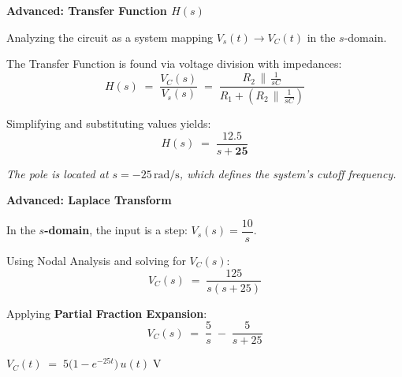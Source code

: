 \documentclass[12pt]{beamer}
\begin{document}
\begin{frame}{\textbf{Advanced: Transfer Function $H(s)$}}
  \begin{center}
    \vfill
    Analyzing the circuit as a system mapping $V_s(t) \to V_C(t)$ in the $s$-domain.

    \vspace{1.5em}
    The Transfer Function is found via voltage division with impedances:
    \[
      H(s) \;=\; \frac{V_C(s)}{V_s(s)}
             \;=\;
             \frac{R_2 \,\|\, \frac{1}{sC}}
                  {R_1 + \left(R_2 \,\|\, \frac{1}{sC}\right)}
    \]

    \vspace{1.5em}
    Simplifying and substituting values yields:
    \[
      H(s) \;=\; \frac{12.5}{s + \mathbf{25}}
    \]

    \vspace{1.5em}
    \normalsize
    \textit{The pole is located at $s = -25\,\mathrm{rad/s}$, which defines the
    system's cutoff frequency.}
    \vfill
  \end{center}
\end{frame}

\begin{frame}{\textbf{Advanced: Laplace Transform}}
  \begin{center}
    \vfill
    In the \textbf{$s$-domain}, the input is a step: $V_s(s) = \dfrac{10}{s}$.

    \vspace{1.5em}
    Using Nodal Analysis and solving for $V_C(s)$:
    \[
      V_C(s) \;=\; \frac{125}{s(s + 25)}
    \]

    \vspace{1.5em}
    Applying \textbf{Partial Fraction Expansion}:
    \[
      V_C(s) \;=\; \frac{5}{s} \;-\; \frac{5}{s + 25}
    \]

    \vspace{2em}
    \Large\textbf{\textcolor{madblue}{$V_C(t) \;=\; 5\bigl(1 - e^{-25t}\bigr)\,u(t)\;\mathrm{V}$}}
    \vfill
  \end{center}
\end{frame}
\end{document}
